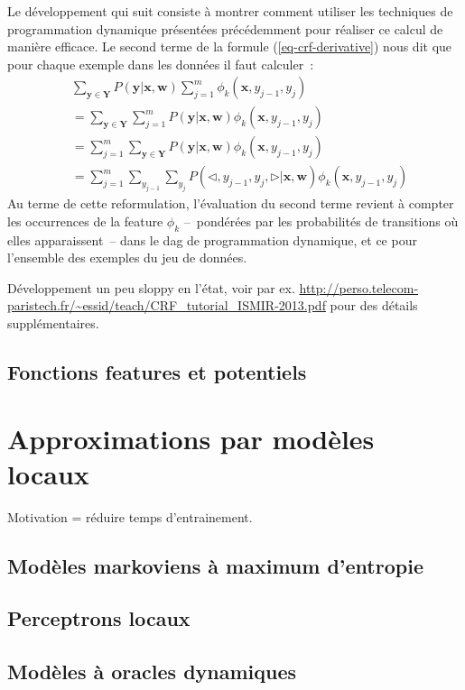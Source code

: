 \documentclass[11pt,openany]{book}
\newcommand{\ac}[1]{{\sc #1}} %
\begin{document}
Le développement qui suit consiste à montrer comment utiliser les techniques de programmation dynamique présentées précédemment pour réaliser ce calcul de manière efficace.  Le second terme de la formule (\ref{eq-crf-derivative}) nous dit que pour chaque exemple dans les données il faut calculer~:
\begin{align}
&\sum_{\mathbf{y}\in \mathbf{Y}} P(\mathbf{y}|\mathbf{x},\mathbf{w}) \sum_{j=1}^m \phi_k(\mathbf{x},y_{j-1},y_j)\\
&=\sum_{\mathbf{y}\in \mathbf{Y}} \sum_{j=1}^m P(\mathbf{y}|\mathbf{x},\mathbf{w})  \phi_k(\mathbf{x},y_{j-1},y_j)\\
&= \sum_{j=1}^m \sum_{\mathbf{y}\in \mathbf{Y}} P(\mathbf{y}|\mathbf{x},\mathbf{w})  \phi_k(\mathbf{x},y_{j-1},y_j)\\
&=  \sum_{j=1}^m \sum_{y_{j-1}}\sum_{y_j} P(\lhd,y_{j-1},y_j,\rhd|\mathbf{x},\mathbf{w})  \phi_k(\mathbf{x},y_{j-1},y_j)
\end{align}
Au terme de cette reformulation, l'évaluation du second terme revient à compter les occurrences de la feature $\phi_k$ --~pondérées par les probabilités de transitions où elles apparaissent~-- dans le \ac{dag} de programmation dynamique, et ce pour l'ensemble des exemples du jeu de données.




{\color{red} Développement un peu sloppy en l'état, voir par ex.
\url{http://perso.telecom-paristech.fr/~essid/teach/CRF_tutorial_ISMIR-2013.pdf}
pour des détails supplémentaires.}


\section{Fonctions features et potentiels}


\chapter{Approximations par modèles locaux}

Motivation = réduire temps d'entrainement.

\section{Modèles markoviens à maximum d'entropie}
\section{Perceptrons locaux}
\section{Modèles à oracles dynamiques}
\end{document}
